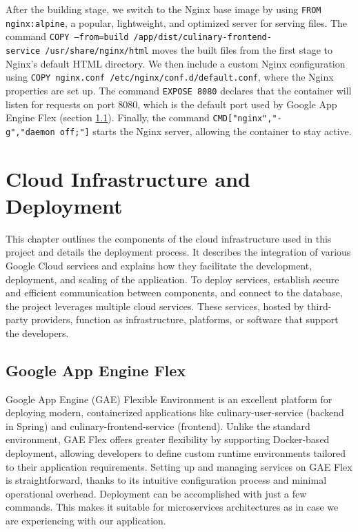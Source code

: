 After the building stage, we switch to the Nginx \cite{Nginx} base image by using \texttt{FROM nginx:alpine}, a popular, lightweight, and optimized server for serving files. The command \texttt{COPY~---from=build~/app/dist/culinary-frontend-service~/usr/share/nginx/html} moves the built files from the first stage to Nginx's default HTML directory. We then include a custom Nginx configuration using \texttt{COPY~nginx.conf~/etc/nginx/conf.d/default.conf}, where the Nginx properties are set up. The command \texttt{EXPOSE 8080} declares that the container will listen for requests on port 8080, which is the default port used by Google App Engine Flex (section \ref{subsec:Google App Engine Flex}). Finally, the command \texttt{CMD["nginx","-g","daemon~off;"]} starts the Nginx server, allowing the container to stay active.


\section{Cloud Infrastructure and Deployment} 

This chapter outlines the components of the cloud infrastructure used in this project and details the deployment process. It describes the integration of various Google Cloud services and explains how they facilitate the development, deployment, and scaling of the application. To deploy services, establish secure and efficient communication between components, and connect to the database, the project leverages multiple cloud services. These services, hosted by third-party providers, function as infrastructure, platforms, or software that support the developers.

\subsection{Google App Engine Flex}\label{subsec:Google App Engine Flex}

Google App Engine (GAE) Flexible Environment \cite{GAE} is an excellent platform for deploying modern, containerized applications like culinary-user-service (backend in Spring) and culinary-frontend-service (frontend). Unlike the standard environment, GAE Flex offers greater flexibility by supporting Docker-based deployment, allowing developers to define custom runtime environments tailored to their application requirements. Setting up and managing services on GAE Flex is straightforward, thanks to its intuitive configuration process and minimal operational overhead. Deployment can be accomplished with just a few commands. This makes it suitable for microservices architectures as in case we are experiencing with our application.

